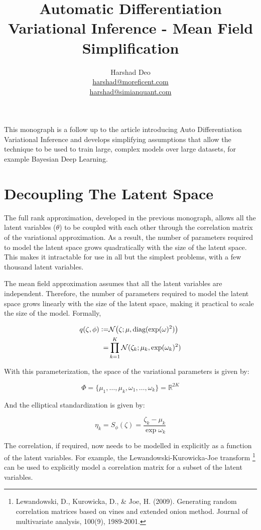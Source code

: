 \documentclass[10pt]{article}
\title{Automatic Differentiation Variational Inference - Mean Field Simplification}
\author{Harshad Deo \\ 
  \href{mailto:harshad@moreficent.com}{harshad@moreficent.com} \\ 
  \href{mailto:harshad@simianquant.com}{harshad@simianquant.com}
}
\date{}
\newcommand{\defeq}{\vcentcolon=}
\begin{document}
  
\maketitle

This monograph is a follow up to the article introducing Auto Differentiation Variational Inference and develops simplifying
assumptions that allow the technique to be used to train large, complex models over large datasets, for example Bayesian 
Deep Learning.

\section*{Decoupling The Latent Space}

The full rank approximation, developed in the previous monograph, allows all the latent variables ($\theta$) to be coupled
with each other through the correlation matrix of the variational approximation. As a result, the number of parameters
required to model the latent space grows quadratically with the size of the latent space. This makes it intractable for 
use in all but the simplest problems, with a few thousand latent variables. 

The mean field approximation assumes that all the latent variables are independent. Therefore, the number of parameters
required to model the latent space grows linearly with the size of the latent space, making it practical to scale the size
of the model. Formally,

\begin{align*}
  q(\zeta, \phi) \defeq& \mathcal{N}\big(\zeta; \mu, \text{diag}(\exp(\omega) ^2)\big) \\
  =& \prod_{k=1}^K \mathcal{N}(\zeta_k; \mu_k, \exp(\omega_k)^2)
\end{align*}

With this parameterization, the space of the variational parameters is given by:

\begin{equation*}
  \Phi = \{\mu_1, \ldots, \mu_k, \omega_1, \ldots, \omega_k\} = \mathbb{R}^{2K}
\end{equation*}

And the elliptical standardization is given by:

\begin{equation*}
  \eta_k = S_{\phi}(\zeta) = \frac{\zeta_k - \mu_k}{\exp \omega_k}
\end{equation*}

The correlation, if required, now needs to be modelled in explicitly as a function of the latent variables. For example, 
the Lewandowski-Kurowicka-Joe transform \footnote{Lewandowski, D., Kurowicka, D., \& Joe, H. (2009). Generating random correlation matrices based on vines and extended onion method. Journal of multivariate analysis, 100(9), 1989-2001.} can be used to explicitly model a correlation matrix for a subset of the latent
variables. 
\end{document}
